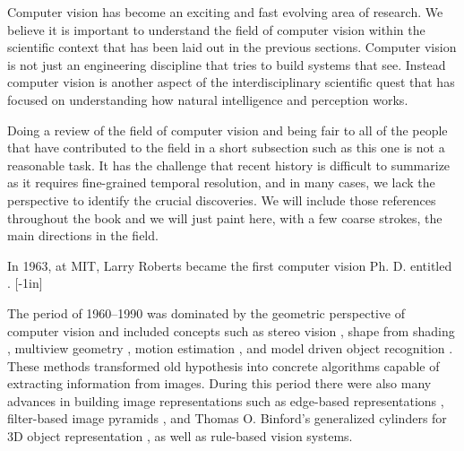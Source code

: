 
Computer vision has become an exciting and fast evolving area of research. We believe it is important to understand the field of computer vision within the scientific context that has been laid out in the previous sections. Computer vision is not just an engineering discipline that tries to build systems that see. Instead computer vision is another aspect of the interdisciplinary scientific quest that has focused on understanding how natural intelligence and perception works.

Doing a review of the field of computer vision and being fair to all of the people that have contributed to the field in a short subsection such as this one is not a reasonable task. It has the challenge that recent history is difficult to summarize as it requires fine-grained temporal resolution, and in many cases, we lack the perspective to identify the crucial discoveries. We will include those references throughout the book and we will just paint here, with a few coarse strokes, the main directions in the field.


In 1963, at MIT, Larry Roberts became the first computer vision Ph. D. entitled  \cite{Roberts63}.
[-1in]

The period of 1960--1990 was dominated by the geometric perspective of computer vision and included concepts such as stereo vision \cite{Longuet-Higgens1981}, shape from shading \cite{Horn89a}, multiview geometry \cite{Faugeras93,Hartley2004}, motion estimation \cite{Horn81}, and model driven object recognition \cite{Fischler1973,Mundy2006}. These methods transformed old hypothesis into concrete algorithms capable of extracting information from images. During this period there were also many advances in building image representations such as edge-based representations \cite{Canny86,Harris88,Koenderink88c,Perona90b}, filter-based image pyramids \cite{Granlund78,Burt83,Koenderink87,Malik90,Freeman91}, and Thomas O. Binford's generalized cylinders for 3D object representation \cite{binford1971}, as well as rule-based vision systems.

